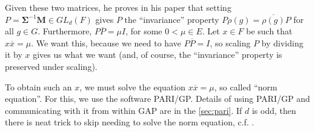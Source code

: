 \documentclass[11pt]{article}
\begin{document}
Given these two matrices, he proves in his paper that setting $P = \mathbf{\Sigma}^{-1}\mathbf{M} \in GL_d(F)$
gives $P$ the ``invariance'' property $P\rho(g) = \overline{\rho(g)}P$ for all $g \in G$. Furthermore, $P\overline{P} = \mu I$,
for some $0 < \mu \in E$. Let $x\in F$ be such that $x\overline{x} = \mu$. We want this, because we need
to have $P\overline{P} = I$, so scaling $P$ by dividing it by $x$ gives us what we want (and, of course,
the ``invariance'' property is preserved under scaling).

To obtain such an $x$, we must solve the equation $x\overline{x} = \mu$, so called ``norm equation''.
For this, we use the software PARI/GP. Details of using PARI/GP and
communicating with it from within GAP are in the \cref{sec:pari}. If $d$ is odd, then
there is neat trick to skip needing to solve the norm equation, c.f. \cite[Lemma 3.4]{Pas21}.
\end{document}
